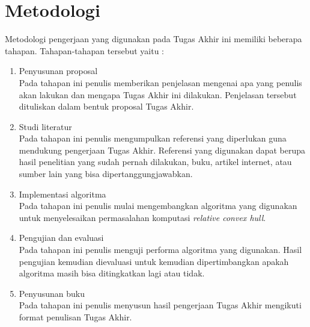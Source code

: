 \section { Metodologi}
Metodologi pengerjaan yang digunakan pada Tugas Akhir ini memiliki beberapa tahapan. Tahapan-tahapan tersebut yaitu :

\begin{enumerate}
    \item Penyusunan proposal\\
    Pada tahapan ini penulis memberikan penjelasan mengenai apa yang penulis akan lakukan dan mengapa Tugas Akhir ini dilakukan. Penjelasan tersebut dituliskan dalam bentuk proposal Tugas Akhir.
    \item Studi literatur\\
    Pada tahapan ini penulis mengumpulkan referensi yang diperlukan guna mendukung pengerjaan Tugas Akhir. Referensi yang digunakan dapat berupa hasil penelitian yang sudah pernah dilakukan, buku, artikel internet, atau sumber lain yang bisa dipertanggungjawabkan.
    \item Implementasi algoritma\\
    Pada tahapan ini penulis mulai mengembangkan algoritma yang digunakan untuk menyelesaikan permasalahan komputasi \textit{relative convex hull}.
    \item Pengujian dan evaluasi\\
    Pada tahapan ini penulis menguji performa algoritma yang digunakan. Hasil pengujian kemudian dievaluasi untuk kemudian dipertimbangkan apakah algoritma masih bisa ditingkatkan lagi atau tidak.
    \item Penyusunan buku\\
    Pada tahapan ini penulis menyusun hasil pengerjaan Tugas Akhir mengikuti format penulisan Tugas Akhir.
\end{enumerate}

